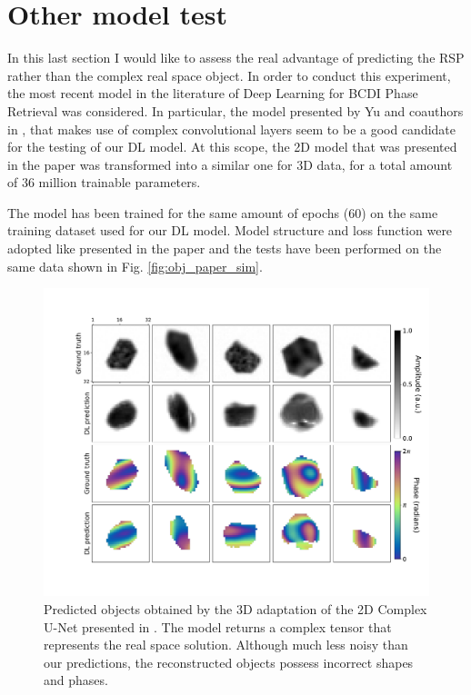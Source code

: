 \section{Other model test}\label{sec:other_model}

In this last section I would like to assess the real advantage of predicting the RSP rather than the complex real space object. 
In order to conduct this experiment, the most recent model in the literature of Deep Learning for BCDI Phase Retrieval was 
considered. In particular, the model presented by Yu and coauthors in \cite{yu_ultrafast_2024}, that makes use of complex 
convolutional layers seem to be a good candidate for the testing of our DL model.
At this scope, the 2D model that was presented in the paper was transformed into a similar one for 3D data, for a total 
amount of 36 million trainable parameters. 

The model has been trained for the same amount of epochs (60) on the same training dataset used for our DL model. Model structure 
and loss function were adopted like presented in the paper and the tests have been performed on the same data shown in Fig. \ref{fig:obj_paper_sim}. 

\begin{figure}[H]
    \centering
    \includegraphics[width=\textwidth]{figures/Phasing/sim_obj_Ian.pdf}
    \caption{Predicted objects obtained by the 3D adaptation of the 2D Complex U-Net presented in \cite{yu_ultrafast_2024}.
    The model returns a complex tensor that represents the real space solution. Although much less noisy than our predictions, 
    the reconstructed objects possess incorrect shapes and phases. }
    \label{fig:Ian_objs}
\end{figure}

